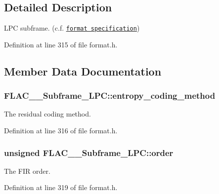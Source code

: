 \subsection{Detailed Description}
L\+PC subframe. (c.\+f. \href{../format.html#subframe_lpc}{\tt format specification}) 

Definition at line 315 of file format.\+h.



\subsection{Member Data Documentation}
\subsubsection[{\texorpdfstring{entropy\+\_\+coding\+\_\+method}{entropy_coding_method}}]{ F\+L\+A\+C\+\_\+\+\_\+\+Subframe\+\_\+\+L\+P\+C\+::entropy\+\_\+coding\+\_\+method}\hypertarget{struct_f_l_a_c_____subframe___l_p_c_adb1401b2f8af05132420145a99f68c6e}{}\label{struct_f_l_a_c_____subframe___l_p_c_adb1401b2f8af05132420145a99f68c6e}
The residual coding method. 

Definition at line 316 of file format.\+h.

\subsubsection[{\texorpdfstring{order}{order}}]{\setlength{\rightskip}{0pt plus 5cm}unsigned F\+L\+A\+C\+\_\+\+\_\+\+Subframe\+\_\+\+L\+P\+C\+::order}\hypertarget{struct_f_l_a_c_____subframe___l_p_c_a0de317accaf8a9f86194f97c378b2f86}{}\label{struct_f_l_a_c_____subframe___l_p_c_a0de317accaf8a9f86194f97c378b2f86}
The F\+IR order. 

Definition at line 319 of file format.\+h.

